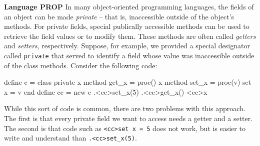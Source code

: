 \begin{minipage}[t]{\sw}
\slidenumber
\LARGE
{\bf Language PROP}\exx
In many object-oriented programming languages,
the fields of an object can be made {\em private} --
that is, inaccessible outside of the object's methods.
For private fields, special publically accessible methods
can be used to retrieve the field values
or to modify them.
These methods are often called {\em getters} and {\em setters},
respectively.\exx
Suppose, for example, we provided a special designator called \verb'private'
that served to identify a field whose value was inaccessible outside
of the class methods.
Consider the following code:
\Large
\begin{qv}
define c =
  class
    private x
    method get_x = proc() x
    method set_x = proc(v) set x = v
  end
define cc = new c
.<cc>set_x(5) %
.<cc>get_x()  %
<cc>x            %
\end{qv}
\LARGE
While this sort of code is common,
there are two problems with this approach.
The first is that every private field we want to access
needs a getter and a setter.
The second is that code such as
\verb'<cc>set x = 5'
does not work, but is easier to write and understand than
\verb'.<cc>set_x(5)'.
\end{minipage}
